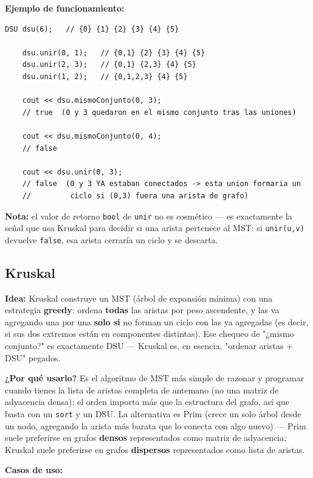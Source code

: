 \documentclass[10pt,a4paper,twocolumn]{article}
\begin{document}
\textbf{Ejemplo de funcionamiento:}

\begin{lstlisting}[style=cpp]
	DSU dsu(6);   // {0} {1} {2} {3} {4} {5}
	
	dsu.unir(0, 1);   // {0,1} {2} {3} {4} {5}
	dsu.unir(2, 3);   // {0,1} {2,3} {4} {5}
	dsu.unir(1, 2);   // {0,1,2,3} {4} {5}
	
	cout << dsu.mismoConjunto(0, 3);
	// true  (0 y 3 quedaron en el mismo conjunto tras las uniones)
	
	cout << dsu.mismoConjunto(0, 4);
	// false
	
	cout << dsu.unir(0, 3);
	// false  (0 y 3 YA estaban conectados -> esta union formaria un
	//         ciclo si (0,3) fuera una arista de grafo)
\end{lstlisting}

\textbf{Nota:} el valor de retorno \texttt{bool} de \texttt{unir} no
es cosmético — es exactamente la señal que usa Kruskal para decidir
si una arista pertenece al MST: si \texttt{unir(u,v)} devuelve
\texttt{false}, esa arista cerraría un ciclo y se descarta.


\subsection{Kruskal}

\textbf{Idea:} Kruskal construye un MST (árbol de expansión mínima)
con una estrategia \textbf{greedy}: ordena \textbf{todas} las aristas
por peso ascendente, y las va agregando una por una \textbf{solo si}
no forman un ciclo con las ya agregadas (es decir, si sus dos
extremos están en componentes distintas). Ese chequeo de "¿mismo
conjunto?" es exactamente DSU — Kruskal es, en esencia, "ordenar
aristas + DSU" pegados.

\textbf{¿Por qué usarlo?} Es el algoritmo de MST más simple de
razonar y programar cuando tienes la lista de aristas completa de
antemano (no una matriz de adyacencia densa): el orden importa más
que la estructura del grafo, así que basta con un \texttt{sort} y un
DSU. La alternativa es Prim (crece un solo árbol desde un nodo,
agregando la arista más barata que lo conecta con algo nuevo) — Prim
suele preferirse en grafos \textbf{densos} representados como matriz
de adyacencia; Kruskal suele preferirse en grafos \textbf{dispersos}
representados como lista de aristas.

\textbf{Casos de uso:}
\end{document}
